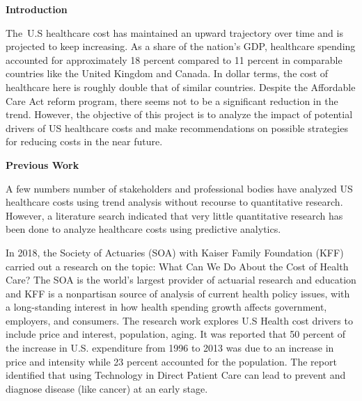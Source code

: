 \documentclass[12pt]{article}
\begin{document}
\vspace{\baselineskip}
\begin{Center}
\textbf{Introduction}
\end{Center}\par


\vspace{\baselineskip}
\begin{justify}
The\ U.S healthcare cost has maintained an upward trajectory over time and is projected to keep increasing. As a share of the nation's GDP, healthcare spending accounted for approximately 18 percent compared to 11 percent in comparable countries like the United Kingdom and Canada.  In dollar terms, the cost of healthcare here is roughly double that of similar countries. Despite the Affordable Care Act reform program, there seems not to be a significant reduction in the trend. However, the objective of this project is to analyze the impact of potential drivers of US healthcare costs and make recommendations on possible strategies for reducing costs in the near future.
\end{justify}\par


\vspace{\baselineskip}
\begin{adjustwidth}{0.25in}{0.0in}
\begin{Center}
\textbf{Previous Work}
\end{Center}\par

\end{adjustwidth}

\begin{justify}
A few numbers number of stakeholders and professional bodies have analyzed US healthcare costs using trend analysis without recourse to quantitative research. However, a literature search indicated that very little quantitative research has been done to analyze healthcare costs using predictive analytics.
\end{justify}\par

\tab 
\vspace{\baselineskip}\begin{justify}
In 2018, the Society of Actuaries (SOA) with Kaiser Family Foundation (KFF) carried out a research on the topic: What Can We Do About the Cost of Health Care? The SOA is the world’s largest provider of actuarial research and education and KFF is a nonpartisan source of analysis of current health policy issues, with a long-standing interest in how health spending growth affects government, employers, and consumers. The research work explores U.S Health cost drivers to include price and interest, population, aging. It was reported that 50 percent of the increase in U.S. expenditure from 1996 to 2013 was due to an increase in price and intensity while 23 percent accounted for the population. The report identified that using Technology in Direct Patient Care can lead to prevent and diagnose disease (like cancer) at an early stage.
\end{justify}\par
\end{document}
